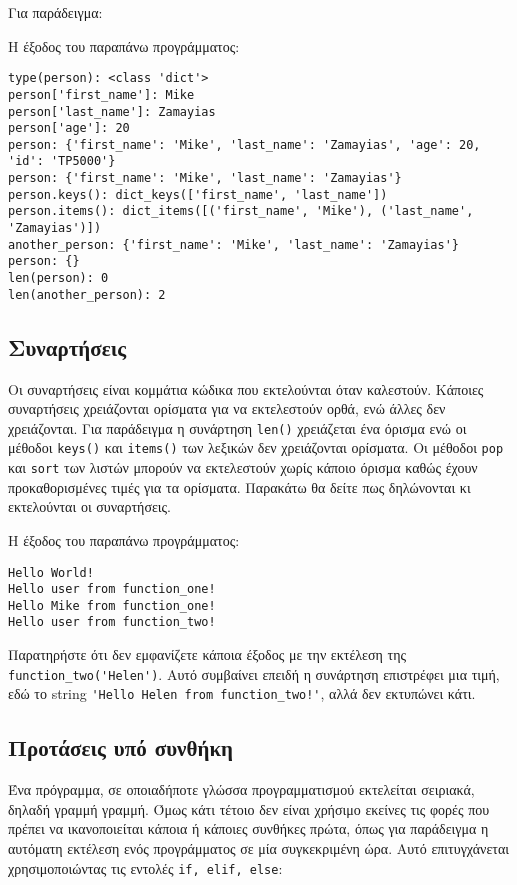 \documentclass[14pt]{extreport}
\begin{document}
Για παράδειγμα:



Η έξοδος του παραπάνω προγράμματος:

\begin{lstlisting}[language={}]
type(person): <class 'dict'>
person['first_name']: Mike
person['last_name']: Zamayias
person['age']: 20
person: {'first_name': 'Mike', 'last_name': 'Zamayias', 'age': 20, 'id': 'TP5000'}
person: {'first_name': 'Mike', 'last_name': 'Zamayias'}
person.keys(): dict_keys(['first_name', 'last_name'])
person.items(): dict_items([('first_name', 'Mike'), ('last_name', 'Zamayias')])
another_person: {'first_name': 'Mike', 'last_name': 'Zamayias'}
person: {}
len(person): 0
len(another_person): 2
\end{lstlisting}

\newpage

\subsection{Συναρτήσεις}
Οι συναρτήσεις είναι κομμάτια κώδικα που εκτελούνται όταν καλεστούν. Κάποιες συναρτήσεις χρειάζονται ορίσματα για να εκτελεστούν ορθά, ενώ άλλες δεν χρειάζονται. Για παράδειγμα η συνάρτηση \lstinline{len()} χρειάζεται ένα όρισμα ενώ οι μέθοδοι \lstinline{keys()} και \lstinline{items()} των λεξικών δεν χρειάζονται ορίσματα. Οι μέθοδοι \lstinline{pop} και \lstinline{sort} των λιστών μπορούν να εκτελεστούν χωρίς κάποιο όρισμα καθώς έχουν προκαθορισμένες τιμές για τα ορίσματα. Παρακάτω θα δείτε πως δηλώνονται κι εκτελούνται οι συναρτήσεις.



Η έξοδος του παραπάνω προγράμματος:

\begin{lstlisting}[language={}]
Hello World!
Hello user from function_one!
Hello Mike from function_one!
Hello user from function_two!
\end{lstlisting}

Παρατηρήστε ότι δεν εμφανίζετε κάποια έξοδος με την εκτέλεση της \lstinline{function_two('Helen')}. Αυτό συμβαίνει επειδή η συνάρτηση επιστρέφει μια τιμή, εδώ το string \lstinline{'Hello Helen from function_two!'}, αλλά δεν εκτυπώνει κάτι.

\subsection{Προτάσεις υπό συνθήκη}
Ένα πρόγραμμα, σε οποιαδήποτε γλώσσα προγραμματισμού εκτελείται σειριακά, δηλαδή γραμμή γραμμή. Όμως κάτι τέτοιο δεν είναι χρήσιμο εκείνες τις φορές που πρέπει να ικανοποιείται κάποια ή κάποιες συνθήκες πρώτα, όπως για παράδειγμα η αυτόματη εκτέλεση ενός προγράμματος σε μία συγκεκριμένη ώρα. Αυτό επιτυγχάνεται χρησιμοποιώντας τις εντολές \lstinline{if, elif, else}:
\end{document}
